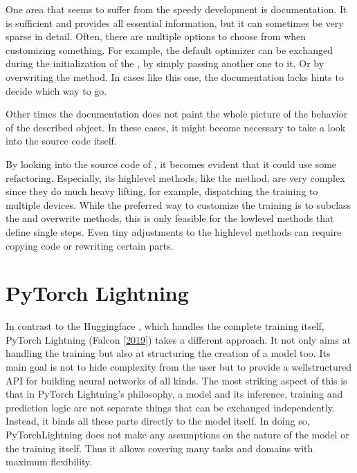 \documentclass[letterpaper,10pt,english]{jupyterBook}
\begin{document}
\sphinxAtStartPar
One area that seems to suffer from the speedy development is documentation.
It is sufficient and provides all essential information, but it can sometimes be very sparse in detail.
Often, there are multiple options to choose from when customizing something.
For example, the default optimizer can be exchanged during the initialization of the , by simply passing another one to it. Or by overwriting the \sphinxhyphen{}method.
In cases like this one, the documentation lacks hints to decide which way to go.

\sphinxAtStartPar
Other times the documentation does not paint the whole picture of the behavior of the described object.
In these cases, it might become necessary to take a look into the source code itself.

\sphinxAtStartPar
By looking into the source code of , it becomes evident that it could use some refactoring.
Especially, its high\sphinxhyphen{}level methods, like the \sphinxhyphen{}method, are very complex since they do much heavy lifting, for example, dispatching the training to multiple devices.
While the preferred way to customize the training is to subclass the  and overwrite methods, this is only feasible for the low\sphinxhyphen{}level methods that define single steps. Even tiny adjustments to the high\sphinxhyphen{}level methods can require copying code or rewriting certain parts.


\chapter{PyTorch Lightning}
\label{\detokenize{PyTorchLightning:pytorch-lightning}}\label{\detokenize{PyTorchLightning::doc}}
\sphinxAtStartPar
In contrast to the Huggingface , which handles the complete training itself, PyTorch Lightning (Falcon {[}\hyperlink{cite.Bibliography:id3}{2019}{]}) takes a different approach.
It not only aims at handling the training but also at structuring the creation of a model too.
Its main goal is not to hide complexity from the user but to provide a well\sphinxhyphen{}structured API for building neural networks of all kinds.
The most striking aspect of this is that in PyTorch Lightning’s philosophy, a model and its inference\sphinxhyphen{}, training and prediction logic are not separate things that can be exchanged independently.
Instead, it binds all these parts directly to the model itself.
In doing so, PyTorch\sphinxhyphen{}Lightning does not make any assumptions on the nature of the model or the training itself. Thus it allows covering many tasks and domains with maximum flexibility.
\end{document}
